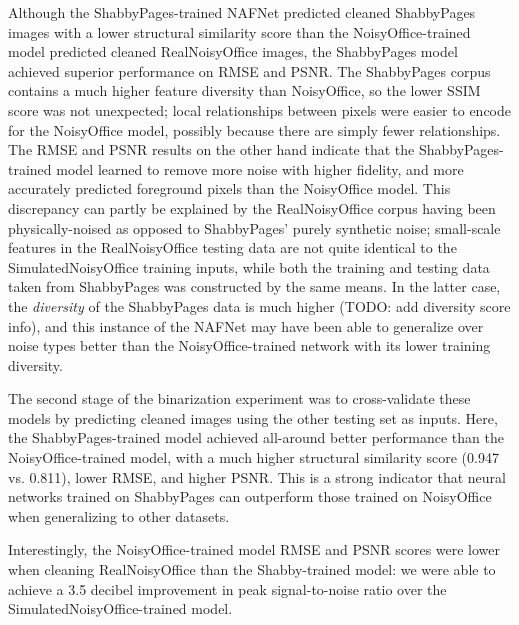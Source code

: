 \documentclass[runningheads]{llncs}
\begin{document}
Although the ShabbyPages-trained NAFNet predicted cleaned ShabbyPages images with a lower structural similarity score than the NoisyOffice-trained model predicted cleaned RealNoisyOffice images, the ShabbyPages model achieved superior performance on RMSE and PSNR.
The ShabbyPages corpus contains a much higher feature diversity than NoisyOffice, so the lower SSIM score was not unexpected; local relationships between pixels were easier to encode for the NoisyOffice model, possibly because there are simply fewer relationships.
The RMSE and PSNR results on the other hand indicate that the ShabbyPages-trained model learned to remove more noise with higher fidelity, and more accurately predicted foreground pixels than the NoisyOffice model.
This discrepancy can partly be explained by the RealNoisyOffice corpus having been physically-noised as opposed to ShabbyPages' purely synthetic noise; small-scale features in the RealNoisyOffice testing data are not quite identical to the SimulatedNoisyOffice training inputs, while both the training and testing data taken from ShabbyPages was constructed by the same means.
In the latter case, the \textit{diversity} of the ShabbyPages data is much higher (TODO: add diversity score info), and this instance of the NAFNet may have been able to generalize over noise types better than the NoisyOffice-trained network with its lower training diversity.

The second stage of the binarization experiment was to cross-validate these models by predicting cleaned images using the other testing set as inputs.
Here, the ShabbyPages-trained model achieved all-around better performance than the NoisyOffice-trained model, with a much higher structural similarity score (0.947 vs. 0.811), lower RMSE, and higher PSNR.
This is a strong indicator that neural networks trained on ShabbyPages can outperform those trained on NoisyOffice when generalizing to other datasets.

Interestingly, the NoisyOffice-trained model RMSE and PSNR scores were lower when cleaning RealNoisyOffice than the Shabby-trained model: we were able to achieve a 3.5 decibel improvement in peak signal-to-noise ratio over the SimulatedNoisyOffice-trained model.


%
%
%
 
 
\end{document}
